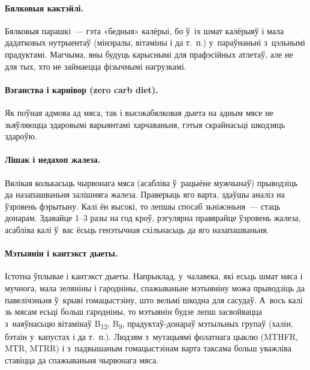 
\paragraph{Бялковыя кактэйлі.}
Бялковыя парашкі~--- гэта «бедныя» калёрыі, бо ў~іх шмат калёрыяў і мала дадатковых нутрыентаў (мінэралы, вітаміны і да т.~п.) у~параўнаньні з~цэльнымі прадуктамі. Магчыма, яны будуць карыснымі для прафэсійных атлетаў, але не для тых, хто не займаецца фізычнымі нагрузкамі.

\paragraph{Вэганства і карнівор (zero carb diet).}
Як поўная адмова ад мяса, так і высокабялковая дыета на адным мясе не зьяўляюцца здаровымі варыянтамі харчаваньня, гэтыя скрайнасьці шкодзяць здароўю.

\paragraph{Лішак і недахоп жалеза.}
Вялікая колькасьць чырвонага мяса (асабліва ў~рацыёне мужчынаў) прыводзіць да назапашваньня залішняга жалеза. Праверыць яго варта, здаўшы аналіз на ўзровень фэрытыну. Калі ён высокі, то лепшы спосаб зьніжэньня~--- стаць донарам. Здавайце 1--3 разы на год кроў, рэгулярна правярайце ўзровень жалеза, асабліва калі ў~вас ёсьць генэтычная схільнасьць да яго назапашваньня.

\paragraph{Мэтыянін і кантэкст дыеты.}
Істотна ўплывае і кантэкст дыеты. Напрыклад, у~чалавека, які есьць шмат мяса і мучнога, мала зеляніны і гародніны, спажываньне мэтыяніну можа прыводзіць да павелічэньня ў~крыві гомацыстэіну, што вельмі шкодна для сасудаў. А~вось калі зь мясам есьці больш гародніны, то мэтыянін будзе лепш засвойвацца з~наяўнасьцю вітамінаў B\textsubscript{12}, B\textsubscript{9}, прадуктаў-донараў мэтыльных групаў (халін, бэтаін у~капустах і да т.~п.). Людзям з~мутацыямі фолатнага цыклю (MTHFR, MTR, MTRR) і з~падвышаным гомацыстэінам варта таксама больш уважліва ставіцца да спажываньня чырвонага мяса.

